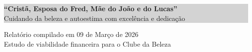\documentclass[12pt, a4paper]{article}
\begin{document}
\begin{center}
    \vspace{0.5cm}

    \colorbox{lightGray}{%
        \parbox{0.9\textwidth}{%
            \centering
            \vspace{0.4cm}
            \textcolor{primaryColor}{\large \textbf{``Cristã, Esposa do Fred, Mãe do João e do Lucas''}} \\
            \vspace{0.2cm}
            \textcolor{secondaryText}{\normalsize Cuidando da beleza e autoestima com excelência e dedicação} \\
            \vspace{0.4cm}
        }%
    }

    \vfill

    \textcolor{secondaryText}{\footnotesize Relatório compilado em 09 de Março de 2026} \\
    \textcolor{secondaryText}{\footnotesize Estudo de viabilidade financeira para o Clube da Beleza}

\end{center}
\end{document}
